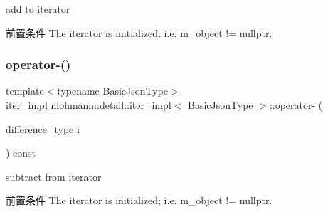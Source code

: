 add to iterator 

\begin{DoxyPrecond}{前置条件}
The iterator is initialized; i.\+e. {\ttfamily m\+\_\+object != nullptr}. 
\end{DoxyPrecond}
\mbox{\label{classnlohmann_1_1detail_1_1iter__impl_a0dd9c415b94a02ff2aa25da75e52da30}} 
\subsubsection{\texorpdfstring{operator-\/()}{operator-()}\hspace{0.1cm}{\footnotesize\ttfamily [1/2]}}
{\footnotesize\ttfamily template$<$typename Basic\+Json\+Type$>$ \\
\mbox{\hyperlink{classnlohmann_1_1detail_1_1iter__impl}{iter\+\_\+impl}} \mbox{\hyperlink{classnlohmann_1_1detail_1_1iter__impl}{nlohmann\+::detail\+::iter\+\_\+impl}}$<$ Basic\+Json\+Type $>$\+::operator-\/ (\begin{DoxyParamCaption}\item[{\mbox{\hyperlink{classnlohmann_1_1detail_1_1iter__impl_a2f7ea9f7022850809c60fc3263775840}{difference\+\_\+type}}}]{i }\end{DoxyParamCaption}) const\hspace{0.3cm}{\ttfamily [inline]}}



subtract from iterator 

\begin{DoxyPrecond}{前置条件}
The iterator is initialized; i.\+e. {\ttfamily m\+\_\+object != nullptr}. 
\end{DoxyPrecond}
\mbox{\label{classnlohmann_1_1detail_1_1iter__impl_a49bf3e708a9c1c88c415011735962d06}} 
